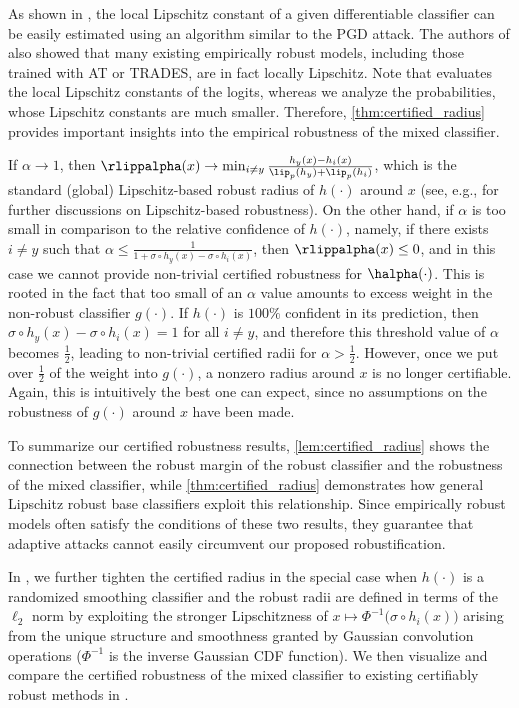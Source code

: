 \documentclass[11pt, letterpaper]{article}
\theoremstyle{plain}
\theoremstyle{definition}
\begin{document}
As shown in \citep{Yang20}, the local Lipschitz constant of a given differentiable classifier can be easily estimated using an algorithm similar to the PGD attack. The authors of \citep{Yang20} also showed that many existing empirically robust models, including those trained with AT or TRADES, are in fact locally Lipschitz. Note that \citep{Yang20} evaluates the local Lipschitz constants of the logits, whereas we analyze the probabilities, whose Lipschitz constants are much smaller. Therefore, \cref{thm:certified_radius} provides important insights into the empirical robustness of the mixed classifier.

If $\alpha \to 1$, then $\rlippalpha (x) \to \min_{i \ne y}\frac{h_y(x) - h_i(x)}{\lip_p(h_y) + \lip_p(h_i)}$, which is the standard (global) Lipschitz-based robust radius of $h (\cdot)$ around $x$ (see, e.g., \cite{Fazlyab19, Hein17} for further discussions on Lipschitz-based robustness). On the other hand, if $\alpha$ is too small in comparison to the relative confidence of $h (\cdot)$, namely, if there exists $i \ne y$ such that $\alpha \le \frac{1} {1 + \sigma \circ h_y(x) - \sigma \circ h_i(x)}$, then $\rlippalpha (x) \le 0$, and in this case we cannot provide non-trivial certified robustness for $\halpha (\cdot)$. This is rooted in the fact that too small of an $\alpha$ value amounts to excess weight in the non-robust classifier $g (\cdot)$. If $h (\cdot)$ is $100 \%$ confident in its prediction, then $\sigma \circ h_y(x) - \sigma \circ h_i(x) = 1$ for all $i \ne y$, and therefore this threshold value of $\alpha$ becomes $\frac{1}{2}$, leading to non-trivial certified radii for $\alpha > \frac{1}{2}$. However, once we put over $\frac{1}{2}$ of the weight into $g (\cdot)$, a nonzero radius around $x$ is no longer certifiable. Again, this is intuitively the best one can expect, since no assumptions on the robustness of $g (\cdot)$ around $x$ have been made.

To summarize our certified robustness results, \cref{lem:certified_radius} shows the connection between the robust margin of the robust classifier and the robustness of the mixed classifier, while \cref{thm:certified_radius} demonstrates how general Lipschitz robust base classifiers exploit this relationship. Since empirically robust models often satisfy the conditions of these two results, they guarantee that adaptive attacks cannot easily circumvent our proposed robustification.

In , we further tighten the certified radius in the special case when $h (\cdot)$ is a randomized smoothing classifier and the robust radii are defined in terms of the $\ell_2$ norm by exploiting the stronger Lipschitzness of $x \mapsto \Phi^{-1} \big( \sigma \circ h_i(x) \big)$ arising from the unique structure and smoothness granted by Gaussian convolution operations ($\Phi^{-1}$ is the inverse Gaussian CDF function). We then visualize and compare the certified robustness of the mixed classifier to existing certifiably robust methods in .
\end{document}
